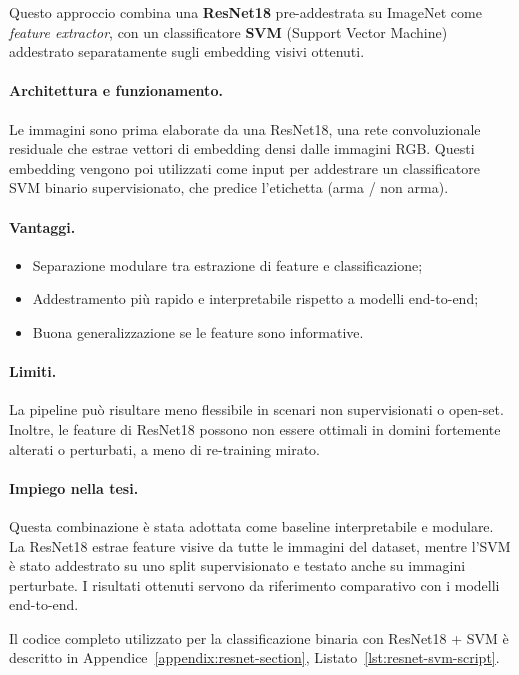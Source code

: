 Questo approccio combina una \textbf{ResNet18} pre-addestrata su ImageNet come \textit{feature extractor}, con un classificatore \textbf{SVM} (Support Vector Machine) addestrato separatamente sugli embedding visivi ottenuti.

\paragraph{Architettura e funzionamento.} Le immagini sono prima elaborate da una ResNet18, una rete convoluzionale residuale che estrae vettori di embedding densi dalle immagini RGB. Questi embedding vengono poi utilizzati come input per addestrare un classificatore SVM binario supervisionato, che predice l’etichetta (arma / non arma).

\paragraph{Vantaggi.}
\begin{itemize}
\item Separazione modulare tra estrazione di feature e classificazione;
\item Addestramento più rapido e interpretabile rispetto a modelli end-to-end;
\item Buona generalizzazione se le feature sono informative.
\end{itemize}

\paragraph{Limiti.} La pipeline può risultare meno flessibile in scenari non supervisionati o open-set. Inoltre, le feature di ResNet18 possono non essere ottimali in domini fortemente alterati o perturbati, a meno di re-training mirato.

\paragraph{Impiego nella tesi.} Questa combinazione è stata adottata come baseline interpretabile e modulare. La ResNet18 estrae feature visive da tutte le immagini del dataset, mentre l’SVM è stato addestrato su uno split supervisionato e testato anche su immagini perturbate. I risultati ottenuti servono da riferimento comparativo con i modelli end-to-end.

Il codice completo utilizzato per la classificazione binaria con ResNet18 + SVM è descritto in Appendice~\ref{appendix:resnet-section}, Listato~\ref{lst:resnet-svm-script}.



